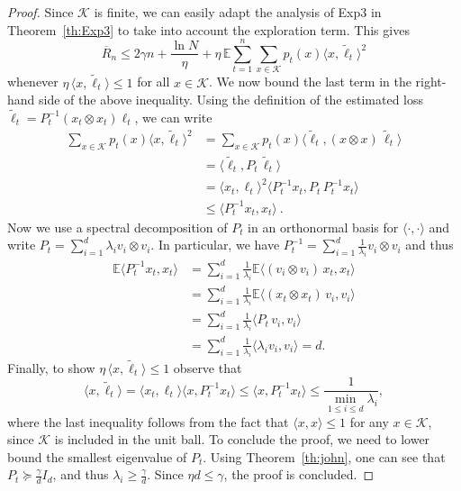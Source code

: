 \documentclass[11pt]{hackednow}
\newcommand{\E}{\mathbb{E}}
\newcommand{\cK}{\mathcal{K}}
\newcommand{\oR}{\overline{R}}
\renewcommand{\tilde}{\widetilde}
\begin{document}
\begin{proof}
Since $\cK$ is finite, we can easily adapt the analysis of Exp3 in Theorem~\ref{th:Exp3} to take into account the exploration term.
This gives
$$\oR_n \leq 2 \gamma n + \frac{\ln N}{\eta} + \eta\,\E \sum_{t=1}^n \sum_{x \in \cK} {p}_t(x) \langle x, \tilde{\ell}_t \rangle^2
$$
whenever
$\eta\,\langle x, \tilde{\ell}_t \rangle \leq 1$ for all $x \in \cK$. We now bound the last term in the right-hand side of the above inequality. Using the definition of the estimated loss $\tilde{\ell}_t = P_t^{-1} \left(x_t \otimes x_t\right) \ell_t$, we can write
\begin{align*}
    \sum_{x \in \cK} {p}_t(x) \langle x, \tilde{\ell}_t \rangle^2
&=
    \sum_{x \in \cK} {p}_t(x) \langle \tilde{\ell}_t, (x \otimes x)\,\tilde{\ell}_t \rangle
\\& =
    \langle \tilde{\ell}_t, P_t\,\tilde{\ell}_t \rangle 
\\&=
    \langle x_t, \ell_t \rangle^2 \langle P_t^{-1} x_t, P_t\, P_t^{-1} x_t\rangle
\\ &\le
    \langle P_t^{-1} x_t, x_t \rangle~.
\end{align*}
Now we use a spectral decomposition of $P_t$ in an orthonormal basis for $\langle \cdot, \cdot \rangle$ and write
$P_t = \sum_{i=1}^d \lambda_i v_i \otimes v_i $. In particular, we have $P_t^{-1} = \sum_{i=1}^d \frac{1}{\lambda_i} v_i \otimes v_i$ and thus
\begin{align*}
\E \langle P_t^{-1} x_t, x_t \rangle & = \sum_{i=1}^d \frac{1}{\lambda_i} \E \langle (v_i \otimes v_i)\, x_t, x_t \rangle \\
& = \sum_{i=1}^d \frac{1}{\lambda_i} \E \langle (x_t \otimes x_t)\, v_i, v_i \rangle \\
& = \sum_{i=1}^d \frac{1}{\lambda_i} \langle P_t\, v_i, v_i \rangle \\
& =  \sum_{i=1}^d \frac{1}{\lambda_i} \langle \lambda_i v_i, v_i \rangle
 =  d.
\end{align*}
Finally, to show $\eta\,\langle x, \tilde{\ell}_t \rangle \le 1$ observe that
$$
\langle x, \tilde{\ell}_t \rangle  =  \langle x_t, \ell_t \rangle \langle x, P_t^{-1} x_t \rangle
 \leq  \langle x, P_t^{-1} x_t \rangle
 \leq  \frac{1}{\min_{1 \leq i \leq d} \lambda_i} ,$$
where the last inequality follows from the fact that $\langle x, x \rangle \leq 1$ for any $x \in \cK$, since $\cK$ is included in the unit ball. To conclude the proof, we need to lower bound the smallest eigenvalue of $P_t$. Using Theorem~\ref{th:john}, one can see that $P_t \succeq \frac{\gamma}{d} I_d$, and thus $\lambda_i \geq \frac{\gamma}{d}$. Since ${\eta d} \le {\gamma}$, the proof is concluded.
\end{proof}
\end{document}
